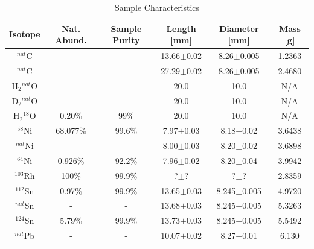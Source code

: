 \documentclass[twocolumn,secnumarabic,amssymb, nobibnotes, aps, prl,
superscriptaddress, nobalancelastpage]{revtex4}
\begin{document}
\begin{table}[ht]
    \caption{Sample Characteristics}
    \label{SampleTable}
    \begin{center}
        \begin{tabular}{ c c c c c c }
            \hline
            Isotope & Nat. Abund. & Sample Purity & Length [mm] & Diameter
            [mm] & Mass [g] \\
            \hline

            $^{nat}$C & - & - & 13.66$\pm$0.02 & 8.26$\pm$0.005 & 1.2363 \\
            $^{nat}$C & - & - & 27.29$\pm$0.02 & 8.26$\pm$0.005 & 2.4680 \\

            H$_{2}$$^{nat}$O & - & - & 20.0 & 10.0 & N/A \\
            D$_{2}$$^{nat}$O & - & - & 20.0 & 10.0 & N/A \\
            H$_{2}$$^{18}$O & 0.20\% & 99\% & 20.0 & 10.0 & N/A \\

            $^{58}$Ni & 68.077\% & 99.6\% & 7.97$\pm$0.03 & 8.18$\pm$0.02 &
            3.6438 \\
            $^{nat}$Ni & - & - & 8.00$\pm$0.03 & 8.20$\pm$0.02 &
            3.6898 \\
            $^{64}$Ni & 0.926\% & 92.2\% & 7.96$\pm$0.02 & 8.20$\pm$0.04 &
            3.9942 \\

            $^{103}$Rh & 100\% & 99.9\% & ?$\pm$? & ?$\pm$? & 2.8359 \\

            $^{112}$Sn & 0.97\% & 99.9\% & 13.65$\pm$0.03 & 8.245$\pm$0.005 &
            4.9720 \\
            $^{nat}$Sn & - & - & 13.68$\pm$0.03 & 8.245$\pm$0.005 &
            5.3263 \\
            $^{124}$Sn & 5.79\% & 99.9\% & 13.73$\pm$0.03 & 8.245$\pm$0.005 &
            5.5492 \\

            $^{nat}$Pb & - & - & 10.07$\pm$0.02 & 8.27$\pm$0.01 & 6.130 \\

            \hline
        \end{tabular}
    \end{center}
\end{table}
\end{document}
